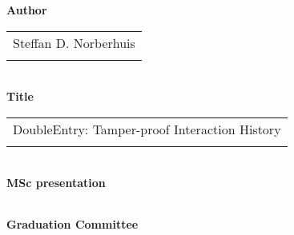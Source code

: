 \thispagestyle{empty}

\noindent \textbf{Author}\\
\begin{tabular}{l}
Steffan D. Norberhuis\\
\\
\end{tabular}\\
\noindent \textbf{Title}\\
\begin{tabular}{l}
DoubleEntry: Tamper-proof Interaction History\\
\\
\end{tabular}\\
\noindent \textbf{MSc presentation}\\
\begin{tabular}{l}
\\
\end{tabular}

\vspace{1.1cm}

\noindent \textbf{Graduation Committee}\\
\begin{tabular}{ll}
\end{tabular}

\begin{abstract} %
\end{abstract}

\clearpage


